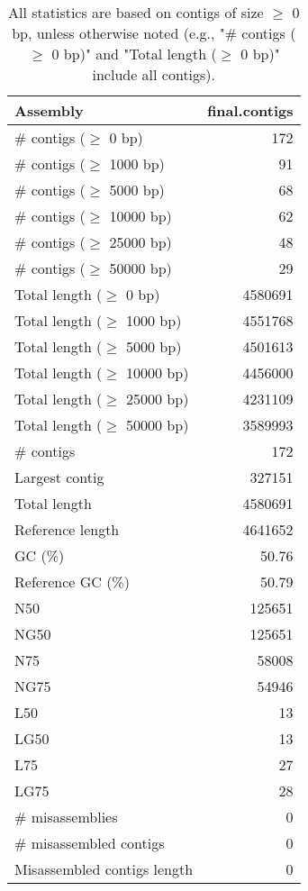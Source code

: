 \documentclass[12pt,a4paper]{article}
\begin{document}
\begin{table}[ht]
\begin{center}
\caption{All statistics are based on contigs of size $\geq$ 0 bp, unless otherwise noted (e.g., "\# contigs ($\geq$ 0 bp)" and "Total length ($\geq$ 0 bp)" include all contigs).}
\begin{tabular}{|l*{1}{|r}|}
\hline
Assembly & final.contigs \\ \hline
\# contigs ($\geq$ 0 bp) & 172 \\ \hline
\# contigs ($\geq$ 1000 bp) & 91 \\ \hline
\# contigs ($\geq$ 5000 bp) & 68 \\ \hline
\# contigs ($\geq$ 10000 bp) & 62 \\ \hline
\# contigs ($\geq$ 25000 bp) & 48 \\ \hline
\# contigs ($\geq$ 50000 bp) & 29 \\ \hline
Total length ($\geq$ 0 bp) & 4580691 \\ \hline
Total length ($\geq$ 1000 bp) & 4551768 \\ \hline
Total length ($\geq$ 5000 bp) & 4501613 \\ \hline
Total length ($\geq$ 10000 bp) & 4456000 \\ \hline
Total length ($\geq$ 25000 bp) & 4231109 \\ \hline
Total length ($\geq$ 50000 bp) & 3589993 \\ \hline
\# contigs & 172 \\ \hline
Largest contig & 327151 \\ \hline
Total length & 4580691 \\ \hline
Reference length & 4641652 \\ \hline
GC (\%) & 50.76 \\ \hline
Reference GC (\%) & 50.79 \\ \hline
N50 & 125651 \\ \hline
NG50 & 125651 \\ \hline
N75 & 58008 \\ \hline
NG75 & 54946 \\ \hline
L50 & 13 \\ \hline
LG50 & 13 \\ \hline
L75 & 27 \\ \hline
LG75 & 28 \\ \hline
\# misassemblies & 0 \\ \hline
\# misassembled contigs & 0 \\ \hline
Misassembled contigs length & 0 \\ \hline

\end{tabular}
\end{center}
\end{table}
\end{document}
